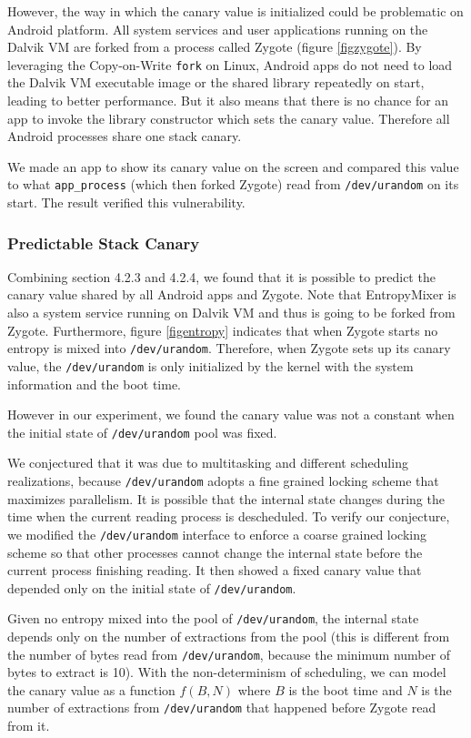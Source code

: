 However, the way in which the canary value is initialized could be problematic on Android platform. All system services and user applications running on the Dalvik VM are forked from a process called Zygote (figure \ref{figzygote}). By leveraging the Copy-on-Write \verb|fork| on Linux, Android apps do not need to load the Dalvik VM executable image or the shared library repeatedly on start, leading to better performance. But it also means that there is no chance for an app to invoke the library constructor which sets the canary value. Therefore all Android processes share one stack canary.

We made an app \cite{jnioverflow} to show its canary value on the screen and compared this value to what \verb|app_process| (which then forked Zygote) read from \verb|/dev/urandom| on its start. The result verified this vulnerability. 

\subsubsection{Predictable Stack Canary}

Combining section 4.2.3 and 4.2.4, we found that it is possible to predict the canary value shared by all Android apps and Zygote. Note that EntropyMixer is also a system service running on Dalvik VM and thus is going to be forked from Zygote. Furthermore, figure \ref{figentropy} indicates that when Zygote starts no entropy is mixed into \verb|/dev/urandom|. Therefore, when Zygote sets up its canary value, the \verb|/dev/urandom| is only initialized by the kernel with the system information and the boot time. 

However in our experiment, we found the canary value was not a constant when the initial state of \verb|/dev/urandom| pool was fixed. 

We conjectured that it was due to multitasking and different scheduling realizations, because \verb|/dev/urandom| adopts a fine grained locking scheme that maximizes parallelism. It is possible that the internal state changes during the time when the current reading process is descheduled. To verify our conjecture, we modified the \verb|/dev/urandom| interface to enforce a coarse grained locking scheme so that other processes cannot change the internal state before the current process finishing reading. It then showed a fixed canary value that depended only on the initial state of \verb|/dev/urandom|.

Given no entropy mixed into the pool of \verb|/dev/urandom|, the internal state depends only on the number of extractions from the pool (this is different from the number of bytes read from \verb|/dev/urandom|, because the minimum number of bytes to extract is 10). With the non-determinism of scheduling, we can model the canary value as a function $f(B,N)$ where $B$ is the boot time and $N$ is the number of extractions from \verb|/dev/urandom| that happened before Zygote read from it.



